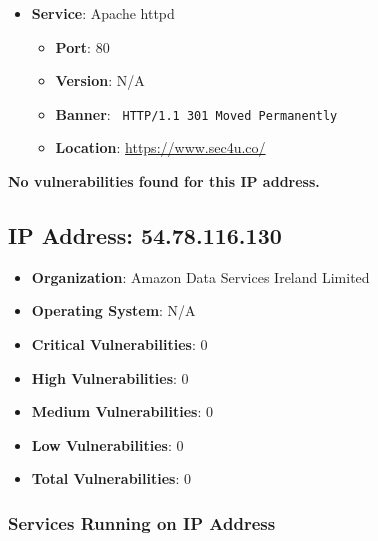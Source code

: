 \documentclass{article}
\begin{document}
\begin{itemize}
    
        \item \textbf{Service}: Apache httpd
        \begin{itemize}
            \item \textbf{Port}: 80
            \item \textbf{Version}:  N/A 
            \item \textbf{Banner}: \texttt{
                HTTP/1.1 301 Moved Permanently
            }
            \item \textbf{Location}: \href{ https://www.sec4u.co/ }{ https://www.sec4u.co/ }
        \end{itemize}
    
\end{itemize}


\textbf{No vulnerabilities found for this IP address.}




\clearpage



\subsection*{IP Address: 54.78.116.130}

\begin{itemize}
    \item \textbf{Organization}: Amazon Data Services Ireland Limited
    \item \textbf{Operating System}:  N/A 
    \item \textbf{Critical Vulnerabilities}: 0
    \item \textbf{High Vulnerabilities}: 0
    \item \textbf{Medium Vulnerabilities}: 0
    \item \textbf{Low Vulnerabilities}: 0
    \item \textbf{Total Vulnerabilities}: 0
\end{itemize}

\subsubsection*{Services Running on IP Address}
\end{document}
